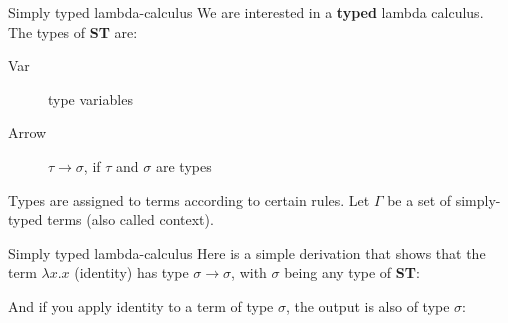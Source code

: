 \documentclass[10pt]{beamer}
\begin{document}
\begin{frame}{Simply typed lambda-calculus}
       We are interested in a {\bf typed} lambda calculus. The types of {\bf ST} are:
        \begin{description}
     \item[Var] type variables 
     \item[Arrow] $\tau \rightarrow \sigma$, if $\tau$ and $\sigma$ are types
       \end{description}
       Types are assigned to terms according to certain rules. Let $\Gamma$ be a set of simply-typed terms (also called context). 
       \begin{prooftree}
                 \end{prooftree}

         \begin{prooftree}
         \end{prooftree}

         \begin{prooftree}
         \end{prooftree}
\end{frame}
\begin{frame}{Simply typed lambda-calculus}
         Here is a simple derivation that shows that the term $\lambda x. x$ (identity) has type $\sigma \rightarrow \sigma$, with $\sigma$ being any type of {\bf ST}: \begin{prooftree}
         \end{prooftree}

And if you apply identity to a term of type $\sigma$, the output is also of type $\sigma$:

\begin{prooftree}
         \end{prooftree}
         \end{frame}
         
\end{document}
